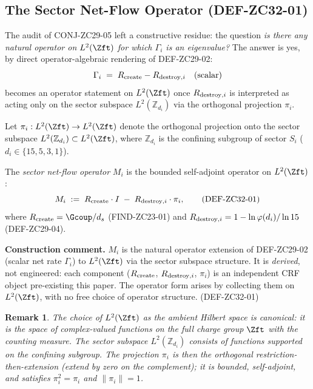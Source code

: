 \documentclass[12pt, a4paper]{article}
\newtheorem{remark}{Remark}[section]
\begin{document}
\subsection{The Sector Net-Flow Operator (DEF-ZC32-01)}
\label{sec:def-zc32-01}

The audit of CONJ-ZC29-05 left a constructive residue: the
question \emph{is there any natural operator on $L^2(\Zft)$
for which $\Gamma_i$ is an eigenvalue?} The answer is yes, by
direct operator-algebraic rendering of DEF-ZC29-02:
\[
  \Gamma_i \;=\; R_{\rm create} - R_{{\rm destroy},i}
  \quad(\text{scalar})
\]
becomes an operator statement on $L^2(\Zft)$ once
$R_{{\rm destroy},i}$ is interpreted as acting only on the
sector subspace $L^2(\mathbb{Z}_{d_i})$ via the orthogonal
projection $\pi_i$.

\begin{formalbox}[title={DEF-ZC32-01: Sector net-flow operator
  $M_i$}]
Let $\pi_i : L^2(\Zft) \to L^2(\Zft)$ denote the orthogonal
projection onto the sector subspace $L^2(\mathbb{Z}_{d_i})
\subset L^2(\Zft)$, where $\mathbb{Z}_{d_i}$ is the confining
subgroup of sector $S_i$ ($d_i \in \{15, 5, 3, 1\}$).

The \emph{sector net-flow operator} $M_i$ is the bounded
self-adjoint operator on $L^2(\Zft)$:
\begin{equation}
  M_i \;:=\; R_{\rm create}\cdot I
            \;-\; R_{{\rm destroy},i}\cdot \pi_i,
  \tag{DEF-ZC32-01}\label{eq:def-zc32-01}
\end{equation}
where $R_{\rm create} = \Gcoup/d_s$ (FIND-ZC23-01) and
$R_{{\rm destroy},i} = 1 - \ln\varphi(d_i)/\ln 15$
(DEF-ZC29-04).

\textbf{Construction comment.}
$M_i$ is the natural operator extension of DEF-ZC29-02
(scalar net rate $\Gamma_i$) to $L^2(\Zft)$ via the sector
subspace structure. It is \emph{derived}, not engineered:
each component ($R_{\rm create}$, $R_{{\rm destroy},i}$,
$\pi_i$) is an independent CRF object pre-existing this
paper. The operator form arises by collecting them on
$L^2(\Zft)$, with no free choice of operator structure.
\hfill\textup{(DEF-ZC32-01)}
\end{formalbox}

\begin{remark}
The choice of $L^2(\Zft)$ as the ambient Hilbert space is
canonical: it is the space of complex-valued functions on the
full charge group $\Zft$ with the counting measure. The
sector subspace $L^2(\mathbb{Z}_{d_i})$ consists of functions
supported on the confining subgroup. The projection $\pi_i$
is then the orthogonal restriction-then-extension (extend by
zero on the complement); it is bounded, self-adjoint, and
satisfies $\pi_i^2 = \pi_i$ and $\|\pi_i\| = 1$.
\end{remark}
\end{document}
